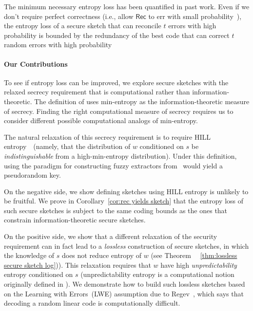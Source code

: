 \documentclass[11pt]{article}
\newcommand{\corref}[1]{\mbox{Corollary~\ref{#1}}}
\newcommand{\class}[1]{{\ensuremath{\mathsf{#1}}}}
\newcommand{\rec}{\ensuremath{\class{Rec}}\xspace}
\newcommand{\authnote}[2]{{\textcolor{red}{\textsf{#1 notes: }\textcolor{blue}{ #2}}\marginpar{\textcolor{red}{\textbf{!!!!!}}}}}
\newcommand{\authnote}[2]{}
\newcommand{\lnote}[1]{{\authnote{Leo}{#1}}}
\begin{document}
The minimum necessary  entropy loss has been quantified in past work.  Even if we don't require perfect correctness (i.e., allow $\rec$ to err with small probability~\cite[Section 8]{DBLP:journals/siamcomp/DodisORS08}), the entropy loss of a secure sketch that can reconcile $t$ errors with high probability is bounded by the redundancy of
the best code that can correct $t$ random errors with high probability~\cite[Proposition 8.2]{DBLP:journals/siamcomp/DodisORS08}

\paragraph {Our Contributions}
To see if entropy loss can be improved, we explore secure sketches with the relaxed secrecy requirement that is computational rather than information-theoretic.  The definition of  \cite{DBLP:journals/siamcomp/DodisORS08} uses min-entropy as the information-theoretic measure of secrecy. 
 Finding the right computational measure of secrecy requires us to consider different possible computational analogs of min-entropy.

The natural relaxation of this secrecy requirement is to require HILL entropy~\cite{DBLP:journals/siamcomp/HastadILL99}~(namely, that the distribution of $w$ conditioned on $s$ be \emph{indistinguishable} from a high-min-entropy distribution).  Under this definition, using the paradigm for constructing fuzzy extractors from~\cite{DBLP:journals/siamcomp/DodisORS08} would yield a pseudorandom key.  

On the negative side, we show defining sketches using HILL entropy is unlikely to be fruitful. We prove in \corref{cor:rec yields sketch} that the entropy loss of such secure sketches is subject to the same coding bounds as the ones that constrain information-theoretic secure sketches.

On the positive side, we show that a different relaxation of the security requirement can in fact lead to a \emph{lossless} construction of secure sketches, in which the knowledge of $s$ does not reduce entropy of $w$ (see Theorem~%
~\ref{thm:lossless secure sketch log})).  This relaxation requires that $w$ have high \emph{unpredictability} entropy conditioned on $s$ (unpredictability  entropy is a computational notion originally defined in \cite[Section 5]{DBLP:conf/eurocrypt/HsiaoLR07}).  We demonstrate how to build such lossless sketches based on the Learning with Errors~(LWE) assumption due to Regev~\cite{regev2005LWE, regevLWEsurvey},  which says that decoding a random linear code is computationally difficult. 
\end{document}
